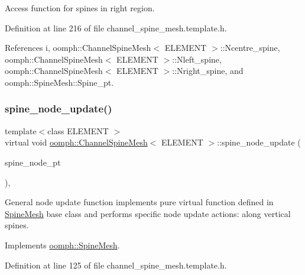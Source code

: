 Access function for spines in right region. 



Definition at line 216 of file channel\+\_\+spine\+\_\+mesh.\+template.\+h.



References i, oomph\+::\+Channel\+Spine\+Mesh$<$ E\+L\+E\+M\+E\+N\+T $>$\+::\+Ncentre\+\_\+spine, oomph\+::\+Channel\+Spine\+Mesh$<$ E\+L\+E\+M\+E\+N\+T $>$\+::\+Nleft\+\_\+spine, oomph\+::\+Channel\+Spine\+Mesh$<$ E\+L\+E\+M\+E\+N\+T $>$\+::\+Nright\+\_\+spine, and oomph\+::\+Spine\+Mesh\+::\+Spine\+\_\+pt.

\mbox{\label{classoomph_1_1ChannelSpineMesh_aefa38017e44e64ad0cd86d87d397bf8d}} 
\subsubsection{\texorpdfstring{spine\+\_\+node\+\_\+update()}{spine\_node\_update()}}
{\footnotesize\ttfamily template$<$class E\+L\+E\+M\+E\+NT $>$ \\
virtual void \hyperlink{classoomph_1_1ChannelSpineMesh}{oomph\+::\+Channel\+Spine\+Mesh}$<$ E\+L\+E\+M\+E\+NT $>$\+::spine\+\_\+node\+\_\+update (\begin{DoxyParamCaption}\item[{\hyperlink{classoomph_1_1SpineNode}{Spine\+Node} $\ast$}]{spine\+\_\+node\+\_\+pt }\end{DoxyParamCaption})\hspace{0.3cm}{\ttfamily [inline]}, {\ttfamily [virtual]}}



General node update function implements pure virtual function defined in \hyperlink{classoomph_1_1SpineMesh}{Spine\+Mesh} base class and performs specific node update actions\+: along vertical spines. 



Implements \hyperlink{classoomph_1_1SpineMesh_aa7843aadce3c540f34442671f59eb75b}{oomph\+::\+Spine\+Mesh}.



Definition at line 125 of file channel\+\_\+spine\+\_\+mesh.\+template.\+h.



